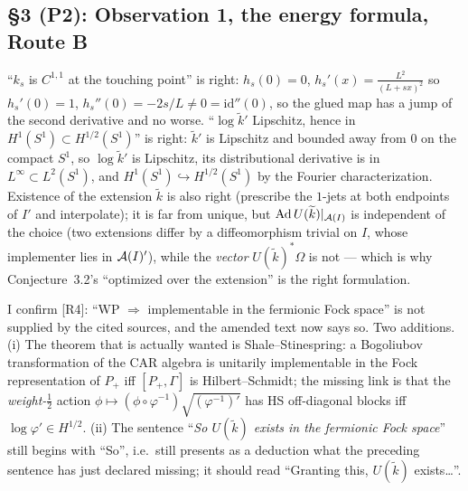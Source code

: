 \documentclass[11pt]{article}
\begin{document}
\subsection{\S3 (P2): Observation 1, the energy formula, Route B}

\begin{verdictok}
``$k_s$ is $C^{1,1}$ at the touching point'' is right: $h_s(0)=0$, $h_s'(x)=\frac{L^2}{(L+sx)^2}$ so $h_s'(0)=1$,
$h_s''(0)=-2s/L\ne0=\mathrm{id}''(0)$, so the glued map has a jump of the second derivative and no worse.
``$\log\widetilde k'$ Lipschitz, hence in $H^1(S^1)\subset H^{1/2}(S^1)$'' is right: $\widetilde k'$ is Lipschitz
and bounded away from $0$ on the compact $S^1$, so $\log\widetilde k'$ is Lipschitz, its distributional derivative
is in $L^\infty\subset L^2(S^1)$, and $H^1(S^1)\hookrightarrow H^{1/2}(S^1)$ by the Fourier characterization.
Existence of the extension $\widetilde k$ is also right (prescribe the $1$-jets at both endpoints of $I'$ and
interpolate); it is far from unique, but $\operatorname{Ad}U(\widetilde k)|_{\mathcal A(I)}$ is independent of the choice
(two extensions differ by a diffeomorphism trivial on $I$, whose implementer lies in $\mathcal A(I)'$), while the
\emph{vector} $U(\widetilde k)^*\Omega$ is not --- which is why Conjecture~3.2's ``optimized over the extension''
is the right formulation.
\end{verdictok}
\begin{verdictgap}
I confirm [R4]: ``WP $\Rightarrow$ implementable in the fermionic Fock space'' is not supplied by the cited
sources, and the amended text now says so.  Two additions.  (i) The theorem that is actually wanted is
Shale--Stinespring: a Bogoliubov transformation of the CAR algebra is unitarily implementable in the Fock
representation of $P_+$ iff $[P_+,\Gamma]$ is Hilbert--Schmidt; the missing link is that the \emph{weight-$\frac12$}
action $\phi\mapsto(\phi\circ\varphi^{-1})\sqrt{(\varphi^{-1})'}$ has HS off-diagonal blocks iff
$\log\varphi'\in H^{1/2}$.  (ii) The sentence ``\emph{So $U(\widetilde k)$ exists in the fermionic Fock space}''
still begins with ``So'', i.e.\ still presents as a deduction what the preceding sentence has just declared
missing; it should read ``Granting this, $U(\widetilde k)$ exists\ldots''.
\end{verdictgap}
\end{document}
